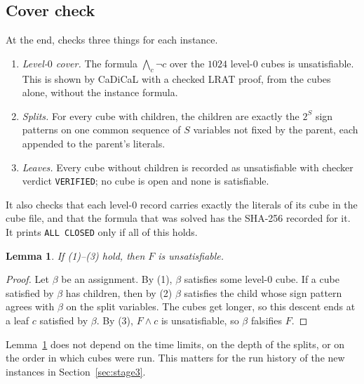 \documentclass[11pt]{amsart}
\newtheorem{lemma}[theorem]{Lemma}
\theoremstyle{definition}
\theoremstyle{remark}
\begin{document}
\subsection{Cover check}
At the end,  checks three things for each
instance.
\begin{enumerate}[label=(\arabic*)]
\item \emph{Level-$0$ cover.} The formula $\bigwedge_{c} \neg c$ over the $1024$
  level-$0$ cubes is unsatisfiable. This is shown by CaDiCaL with a checked LRAT
  proof, from the cubes alone, without the instance formula.
\item \emph{Splits.} For every cube with children, the children are exactly
  the $2^{S}$ sign patterns on one common sequence of $S$ variables not fixed by
  the parent, each appended to the parent's literals.
\item \emph{Leaves.} Every cube without children is recorded as unsatisfiable
  with checker verdict \texttt{VERIFIED}; no cube is open and none is
  satisfiable.
\end{enumerate}
It also checks that each level-$0$ record carries exactly the literals of its
cube in the cube file, and that the formula that was solved has the SHA-256
recorded for it. It prints \texttt{ALL CLOSED} only if all of this holds.

\begin{lemma}\label{lem:cover}
If (1)--(3) hold, then $F$ is unsatisfiable.
\end{lemma}

\begin{proof}
Let $\beta$ be an assignment. By (1), $\beta$ satisfies some level-$0$ cube.
If a cube satisfied by $\beta$ has children, then by (2) $\beta$ satisfies the
child whose sign pattern agrees with $\beta$ on the split variables. The cubes
get longer, so this descent ends at a leaf $c$ satisfied by $\beta$. By (3),
$F \wedge c$ is unsatisfiable, so $\beta$ falsifies $F$.
\end{proof}

Lemma~\ref{lem:cover} does not depend on the time limits, on the depth of the
splits, or on the order in which cubes were run. This matters for the run
history of the new instances in Section~\ref{sec:stage3}.
\end{document}
